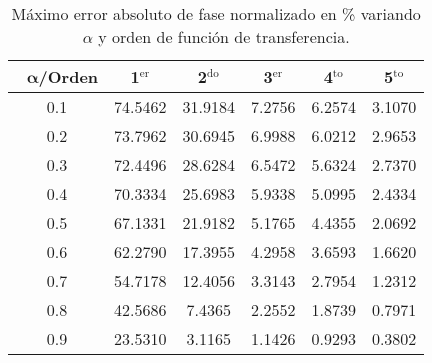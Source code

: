 	\begin{table}[!hbp]                                 
	\centering            
	\caption{Máximo error absoluto de fase normalizado en \% variando $\alpha$ y orden de función de transferencia.}                           
	\label{tab:max_error_fase_norm}                               
		\begin{tabular}{cccccc}
			\hline                                             
			$\,\,\,\,\bm{\alpha}$\textbf{/Orden} & \textbf{1$^{\mathrm{er}}$} & \textbf{2$^{\mathrm{do}}$} & \textbf{3$^{\mathrm{er}}$} & \textbf{4$^{\mathrm{to}}$} & \textbf{5$^{\mathrm{to}}$} \\                     
			\hline                                             
			0.1 & 74.5462 & 31.9184 & 7.2756 & 6.2574 & 3.1070 \\
			                                             
			0.2 & 73.7962 & 30.6945 & 6.9988 & 6.0212 & 2.9653 \\
			                                             
			0.3 & 72.4496 & 28.6284 & 6.5472 & 5.6324 & 2.7370 \\
			                                             
			0.4 & 70.3334 & 25.6983 & 5.9338 & 5.0995 & 2.4334 \\
			                                             
			0.5 & 67.1331 & 21.9182 & 5.1765 & 4.4355 & 2.0692 \\
			                                              
			0.6 & 62.2790 & 17.3955 & 4.2958 & 3.6593 & 1.6620 \\
			                                              
			0.7 & 54.7178 & 12.4056 & 3.3143 & 2.7954 & 1.2312 \\
			                                               
			0.8 & 42.5686 & 7.4365 & 2.2552 & 1.8739 & 0.7971 \\ 
			                                              
			0.9 & 23.5310 & 3.1165 & 1.1426 & 0.9293 & 0.3802 \\ 
			\hline                                             
		\end{tabular}                                                             
	\end{table}

